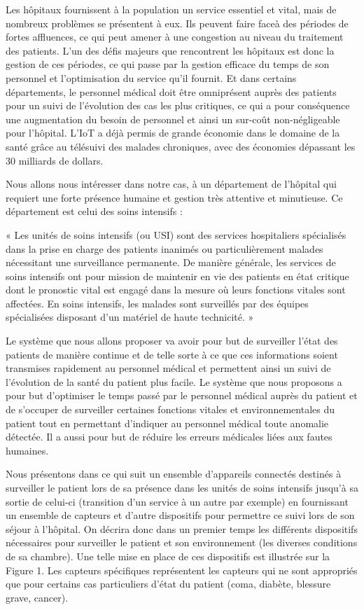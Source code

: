 \documentclass{article}
\begin{document}
 Les hôpitaux fournissent à la population un service essentiel et vital, mais de nombreux problèmes se présentent à eux. Ils peuvent faire faceà des périodes de fortes affluences, ce qui peut amener à une congestion au niveau du traitement des patients. L’un des défis majeurs que rencontrent les hôpitaux est donc la gestion de ces périodes, ce qui passe par la gestion efficace du temps de son personnel et l’optimisation du service qu’il fournit. Et dans certains départements, le personnel médical doit être omniprésent auprès des patients pour un suivi de l’évolution des cas les plus critiques, ce qui a pour conséquence une augmentation du besoin de personnel et ainsi un sur-coût non-négligeable pour l’hôpital. L'IoT a déjà permis de grande économie dans le domaine de la santé grâce au télésuivi des malades chroniques, avec des économies dépassant les 30 milliards de dollars.\cite{OrangeHealthCare}
 
 Nous allons nous intéresser dans notre cas, à un département de l’hôpital qui requiert une forte présence humaine et gestion très attentive et minutieuse. Ce département est celui des soins intensifs :
 
 « Les unités de soins intensifs (ou USI) sont des services hospitaliers spécialisés dans la prise en charge des patients inanimés ou particulièrement malades nécessitant une surveillance permanente. De manière générale, les services de soins intensifs ont pour mission de maintenir en vie des patients en état critique dont le pronostic vital est engagé dans la mesure où leurs fonctions vitales sont affectées. En soins intensifs, les malades sont surveillés par des équipes spécialisées disposant d'un matériel de haute technicité. » \cite{SoinsIntensifs}

Le système que nous allons proposer va avoir pour but de surveiller l’état des patients de manière continue et de telle sorte à ce que ces informations soient transmises rapidement au personnel médical et permettent ainsi un suivi de l’évolution de la santé du patient plus facile. Le système que nous proposons a pour but d’optimiser le temps passé par le personnel médical auprès du patient et de s’occuper de surveiller certaines fonctions vitales et environnementales du patient tout en permettant d’indiquer au personnel médical toute anomalie détectée. Il a aussi pour but de réduire les erreurs médicales liées aux fautes humaines. 

Nous présentons dans ce qui suit un ensemble d’appareils connectés destinés à surveiller le patient lors de sa présence dans les unités de soins intensifs jusqu'à sa sortie de celui-ci (transition d’un service à un autre par exemple) en fournissant un ensemble de capteurs et d’autre dispositifs pour permettre ce suivi lors de son séjour à l’hôpital. On décrira donc dans un premier temps les différents dispositifs nécessaires pour surveiller le patient et son environnement (les diverses conditions de sa chambre). Une telle mise en place de ces dispositifs est illustrée sur la Figure 1. Les capteurs spécifiques représentent les capteurs qui ne sont appropriés que pour certains cas particuliers d’état du patient (coma, diabète, blessure grave, cancer).
\end{document}
